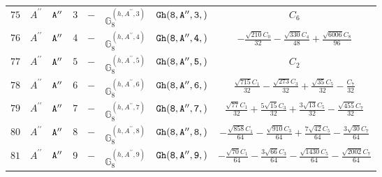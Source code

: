 \documentclass[fleqn,8pt]{jsarticle}
\begin{document}
\begin{table}[ht!]
\begin{center}
\begin{tabular}{cccccccc}
$ 75 $ & $ A^{\prime\prime} $ & $ {\tt A''} $ & $ 3 $ & $ - $ & $ \mathbb{G}_{8}^{(h,A^{\prime\prime},3)} $ & $ {\tt Gh(8,A'',3,)} $ & $ C_{6} $ \\
$ 76 $ & $ A^{\prime\prime} $ & $ {\tt A''} $ & $ 4 $ & $ - $ & $ \mathbb{G}_{8}^{(h,A^{\prime\prime},4)} $ & $ {\tt Gh(8,A'',4,)} $ & $ - \frac{\sqrt{210} C_{0}}{32} - \frac{\sqrt{330} C_{4}}{48} + \frac{\sqrt{6006} C_{8}}{96} $ \\
$ 77 $ & $ A^{\prime\prime} $ & $ {\tt A''} $ & $ 5 $ & $ - $ & $ \mathbb{G}_{8}^{(h,A^{\prime\prime},5)} $ & $ {\tt Gh(8,A'',5,)} $ & $ C_{2} $ \\
$ 78 $ & $ A^{\prime\prime} $ & $ {\tt A''} $ & $ 6 $ & $ - $ & $ \mathbb{G}_{8}^{(h,A^{\prime\prime},6)} $ & $ {\tt Gh(8,A'',6,)} $ & $ \frac{\sqrt{715} C_{1}}{32} - \frac{\sqrt{273} C_{3}}{32} + \frac{\sqrt{35} C_{5}}{32} - \frac{C_{7}}{32} $ \\
$ 79 $ & $ A^{\prime\prime} $ & $ {\tt A''} $ & $ 7 $ & $ - $ & $ \mathbb{G}_{8}^{(h,A^{\prime\prime},7)} $ & $ {\tt Gh(8,A'',7,)} $ & $ \frac{\sqrt{77} C_{1}}{32} + \frac{5 \sqrt{15} C_{3}}{32} + \frac{3 \sqrt{13} C_{5}}{32} - \frac{\sqrt{455} C_{7}}{32} $ \\
$ 80 $ & $ A^{\prime\prime} $ & $ {\tt A''} $ & $ 8 $ & $ - $ & $ \mathbb{G}_{8}^{(h,A^{\prime\prime},8)} $ & $ {\tt Gh(8,A'',8,)} $ & $ - \frac{\sqrt{858} C_{1}}{64} - \frac{\sqrt{910} C_{3}}{64} + \frac{7 \sqrt{42} C_{5}}{64} - \frac{3 \sqrt{30} C_{7}}{64} $ \\
$ 81 $ & $ A^{\prime\prime} $ & $ {\tt A''} $ & $ 9 $ & $ - $ & $ \mathbb{G}_{8}^{(h,A^{\prime\prime},9)} $ & $ {\tt Gh(8,A'',9,)} $ & $ - \frac{\sqrt{70} C_{1}}{64} - \frac{3 \sqrt{66} C_{3}}{64} - \frac{\sqrt{1430} C_{5}}{64} - \frac{\sqrt{2002} C_{7}}{64} $ \\
 \hline \hline
\end{tabular}
\end{center}
\end{table}
\end{document}
